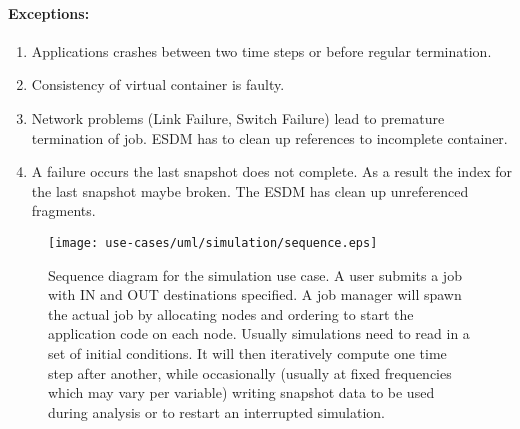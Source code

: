 \paragraph{Exceptions:}
\begin{enumerate}
	\item Applications crashes between two time steps or before regular termination.
	\item Consistency of virtual container is faulty.
	\item Network problems (Link Failure, Switch Failure) lead to premature termination of job. ESDM has to clean up references to incomplete container.
	\item A failure occurs the last snapshot does not complete. As a result the index for the last snapshot maybe broken. The ESDM has clean up unreferenced fragments.
\end{enumerate}


\begin{figure}
	\centering
	\texttt{[image: use-cases/uml/simulation/sequence.eps]}
	\caption{Sequence diagram for the simulation use case. A user submits a job with IN and OUT destinations specified. A job manager will spawn the actual job by allocating nodes and ordering to start the application code on each node. Usually simulations need to read in a set of initial conditions. It will then iteratively compute one time step after another, while occasionally (usually at fixed frequencies which may vary per variable) writing snapshot data to be used during analysis or to restart an interrupted simulation.}
	\label{fig:sequence simulation}
\end{figure}










